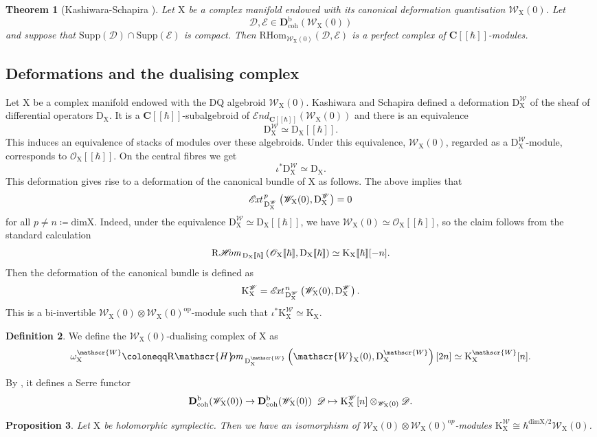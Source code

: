 \documentclass{article}
\theoremstyle{plain}
\newtheorem{theorem}{Theorem}[subsection]   %
\newtheorem{proposition}[theorem]{Proposition}
\theoremstyle{definition}
\newtheorem{definition}[theorem]{Definition}
\theoremstyle{remark}
\newcommand{\Db}{{\mathrm{\bf{D}}}^{\mr{b}}}
\newcommand{\mr}{\mathrm}
\newcommand{\C}{\mathbf C}
\newcommand{\brak}{[\![\hbar]\!]}
\newcommand{\3}{\vspace{3mm}}
\newcommand{\2}{\vspace{2mm}}
\newcommand{\1}{\vspace{1mm}}
\newcommand*{\shom}{\mathscr{H}\text{\kern -3pt {\it{om}}}\,}
\newcommand*{\ext}{\mathscr{E}\text{\kern -1.5pt {\it{xt}}}\,}
\begin{document}
\2
\begin{theorem}[Kashiwara-Schapira \cite{MR3012169}]\label{perf}
 Let $\mr{X}$ be a complex manifold endowed with its canonical deformation quantisation $\mathscr{W}_\mr{X}(0)$. Let $$\mathscr{D}, \mathscr{E} \in \mr{\mathbf{D}}^{\mr b}_\mr{coh}(\mathscr{W}_\mr{X}(0))$$ and suppose that $\mr{Supp}(\mathscr{D})\cap \mr{Supp}(\mathscr{E})$ is compact. Then $\mr{RHom}_{\mathscr{W}_\mr{X}(0)}(\mathscr{D},\mathscr{E})$ is a perfect complex of $\C\brak$-modules.
\end{theorem}
\subsection{Deformations and the dualising complex}
Let $\mr{X}$ be a complex manifold endowed with the DQ algebroid $\mathscr{W}_\mr{X}(0)$. Kashiwara and Schapira \cite{MR3012169} defined a deformation $\mr{D}_\mr{X}^{\mathscr{W}}$ of the sheaf of differential operators $\mr{D}_\mr{X}$. It is a $\C\brak$-subalgebroid of $\mathscr{E}nd_{\C\brak}(\mathscr{W}_\mr{X}(0))$ and there is an equivalence $$\mr{D}_\mr{X}^{\mathscr{W}}\simeq\mr{D}_\mr{X}\brak.$$ This induces an equivalence of stacks of modules over these algebroids. Under this equivalence, $\mathscr{W}_\mr{X}(0)$, regarded as a $\mr{D}_\mr{X}^{\mathscr{W}}$-module, corresponds to $\mathscr{O}_\mr{X}\brak$. On the central fibres we get $$\iota^*\mr{D}_\mr{X}^{\mathscr{W}}\simeq \mr{D}_\mr{X}.$$
This deformation gives rise to a deformation of the canonical bundle of $\mr{X}$ as follows. The above implies that $$\ext^p_{\mr{D}^{\mathscr{W}}_\mr{X}}\left(\mathscr{W}_\mr{X}(0),\mr{D}_\mr{X}^{\mathscr{W}}\right)=0$$ for all $p\not=n\coloneqq\mr{dim}\mr{X}$. Indeed, under the equivalence $\mr{D}^{\mathscr{W}}_\mr{X}\simeq \mr{D}_\mr{X}\brak$, we have $\mathscr{W}_\mr{X}(0)\simeq \mathscr{O}_\mr{X}\brak$, so the claim follows from the standard calculation $$\mr{R}\shom_{\mr{D}_\mr{X}\brak}\left(\mathscr{O}_\mr{X}\brak,\mr{D}_\mr{X}\brak\right)\simeq \mr{K}_\mr{X}\brak[-n].$$
Then the deformation of the canonical bundle is defined as $$\mr{K}_\mr{X}^{\mathscr{W}}=\ext^n_{\mr{D}^{\mathscr{W}}_\mr{X}}\left(\mathscr{W}_\mr{X}(0),\mr{D}_\mr{X}^{\mathscr{W}}\right).$$ This is a bi-invertible $\mathscr{W}_\mr{X}(0)\otimes\mathscr{W}_\mr{X}(0)^{\mr{op}}$-module such that $\iota^*\mr{K}_\mr{X}^{\mathscr{W}}\simeq \mr{K}_\mr{X}$. 
\2
\begin{definition}
We define the $\mathscr{W}_\mr{X}(0)$-dualising complex of $\mr{X}$ as $$\omega^{\mathscr{W}}_\mr{X}\coloneqq \mr{R}\shom_{\mr{D}^{\mathscr{W}}_\mr{X}}\left(\mathscr{W}_\mr{X}(0),\mr{D}^{\mathscr{W}}_\mr{X}\right)[2n]\simeq\mr{K}_\mr{X}^{\mathscr{W}}[n].$$
\end{definition}
By \cite{MR3012169}, it defines a Serre functor $$\Db_{\mr{coh}}(\mathscr{W}_\mr{X}(0))\to \Db_{\mr{coh}}(\mathscr{W}_\mr{X}(0)) \;\; \mathscr{D}\mapsto \mr{K}_\mr{X}^{\mathscr{W}}[n]\otimes_{\mathscr{W}_\mr{X}(0)}\mathscr{D}.$$ 
\begin{proposition}\label{cyprop}
Let $\mr{X}$ be holomorphic symplectic. Then we have an isomorphism of $\mathscr{W}_\mr{X}(0)\otimes\mathscr{W}_\mr{X}(0)^{\mr op}$-modules $\mr{K}_\mr{X}^{\mathscr{W}}\cong \hbar^{\mr{dim}\mr{X}/2}\mathscr{W}_\mr{X}(0)$.
\end{proposition}
\end{document}
